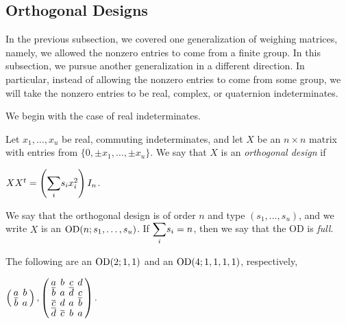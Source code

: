 \documentclass[../../../main]{subfiles}
\begin{document}
 \dinkus


 \subsection{Orthogonal Designs}

 In the previous subsection, we covered one generalization of weighing matrices,
 namely, we allowed the nonzero entries to come from a finite group. In this
 subsection, we pursue another generalization in a different direction. In
 particular, instead of allowing the nonzero entries to come from some group, we
will take the nonzero entries to be real, complex, or
quaternion indeterminates.

We begin with the case of real indeterminates.

\begin{defin}\label{real-od-def}
  Let $x_1, \dots, x_u$ be real, commuting indeterminates, and let $X$ be an $n \times n$ matrix with entries from $\{0,\pm x_1, \dots, \pm x_u\}$. We say that $X$ is an {\it orthogonal design} if
  \begin{defenum}
  \item\label{od-def-eq} $XX^t = \left( \ssum_i s_ix_i^2 \right)I_n$.
  \end{defenum}
  We say that the orthogonal design is of order $n$ and type $(s_1, \dots, s_u)$, and we write $X$ is an $\text{OD}(n;s_1, \dots, s_u)$. If $\ssum_i s_i=n$, then we say that the OD is {\it full}.
\end{defin}

\begin{ex}
  The following are an $\text{OD}(2;1,1)$ and an $\text{OD}(4;1,1,1,1)$, respectively,
  \begin{defenum}
  \item $
    \left(
      \arraycolsep=2.0pt\def\arraystretch{0.5}
      \begin{array}{cc}
        a & b \\ \bar{b} & a
      \end{array}
    \right),
    \left(
      \arraycolsep=2.0pt\def\arraystretch{0.5}
      \begin{array}{cccc}
        a & b & c & d \\
        \bar{b} & a & \bar{d} & c \\
        \bar{c} & d & a & \bar{b} \\
        \bar{d} & \bar{c} & b & a
      \end{array}
    \right).
    $
  \end{defenum}
\end{ex}
\end{document}
